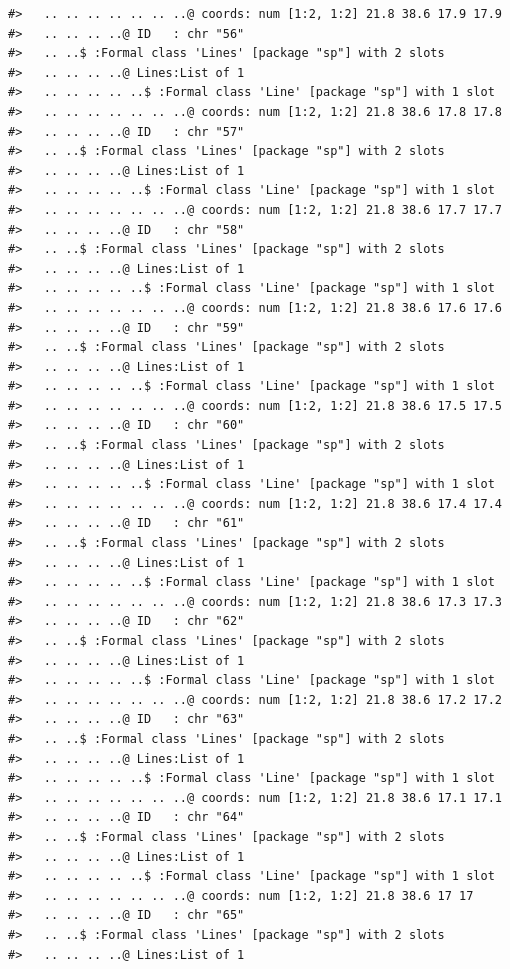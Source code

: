 \documentclass[12pt,a4paper,a4paper]{book}
\theoremstyle{definition}
\theoremstyle{definition}
\theoremstyle{definition}
\theoremstyle{remark}
\begin{document}
\begin{verbatim}
#>   .. .. .. .. .. .. ..@ coords: num [1:2, 1:2] 21.8 38.6 17.9 17.9
#>   .. .. .. ..@ ID   : chr "56"
#>   .. ..$ :Formal class 'Lines' [package "sp"] with 2 slots
#>   .. .. .. ..@ Lines:List of 1
#>   .. .. .. .. ..$ :Formal class 'Line' [package "sp"] with 1 slot
#>   .. .. .. .. .. .. ..@ coords: num [1:2, 1:2] 21.8 38.6 17.8 17.8
#>   .. .. .. ..@ ID   : chr "57"
#>   .. ..$ :Formal class 'Lines' [package "sp"] with 2 slots
#>   .. .. .. ..@ Lines:List of 1
#>   .. .. .. .. ..$ :Formal class 'Line' [package "sp"] with 1 slot
#>   .. .. .. .. .. .. ..@ coords: num [1:2, 1:2] 21.8 38.6 17.7 17.7
#>   .. .. .. ..@ ID   : chr "58"
#>   .. ..$ :Formal class 'Lines' [package "sp"] with 2 slots
#>   .. .. .. ..@ Lines:List of 1
#>   .. .. .. .. ..$ :Formal class 'Line' [package "sp"] with 1 slot
#>   .. .. .. .. .. .. ..@ coords: num [1:2, 1:2] 21.8 38.6 17.6 17.6
#>   .. .. .. ..@ ID   : chr "59"
#>   .. ..$ :Formal class 'Lines' [package "sp"] with 2 slots
#>   .. .. .. ..@ Lines:List of 1
#>   .. .. .. .. ..$ :Formal class 'Line' [package "sp"] with 1 slot
#>   .. .. .. .. .. .. ..@ coords: num [1:2, 1:2] 21.8 38.6 17.5 17.5
#>   .. .. .. ..@ ID   : chr "60"
#>   .. ..$ :Formal class 'Lines' [package "sp"] with 2 slots
#>   .. .. .. ..@ Lines:List of 1
#>   .. .. .. .. ..$ :Formal class 'Line' [package "sp"] with 1 slot
#>   .. .. .. .. .. .. ..@ coords: num [1:2, 1:2] 21.8 38.6 17.4 17.4
#>   .. .. .. ..@ ID   : chr "61"
#>   .. ..$ :Formal class 'Lines' [package "sp"] with 2 slots
#>   .. .. .. ..@ Lines:List of 1
#>   .. .. .. .. ..$ :Formal class 'Line' [package "sp"] with 1 slot
#>   .. .. .. .. .. .. ..@ coords: num [1:2, 1:2] 21.8 38.6 17.3 17.3
#>   .. .. .. ..@ ID   : chr "62"
#>   .. ..$ :Formal class 'Lines' [package "sp"] with 2 slots
#>   .. .. .. ..@ Lines:List of 1
#>   .. .. .. .. ..$ :Formal class 'Line' [package "sp"] with 1 slot
#>   .. .. .. .. .. .. ..@ coords: num [1:2, 1:2] 21.8 38.6 17.2 17.2
#>   .. .. .. ..@ ID   : chr "63"
#>   .. ..$ :Formal class 'Lines' [package "sp"] with 2 slots
#>   .. .. .. ..@ Lines:List of 1
#>   .. .. .. .. ..$ :Formal class 'Line' [package "sp"] with 1 slot
#>   .. .. .. .. .. .. ..@ coords: num [1:2, 1:2] 21.8 38.6 17.1 17.1
#>   .. .. .. ..@ ID   : chr "64"
#>   .. ..$ :Formal class 'Lines' [package "sp"] with 2 slots
#>   .. .. .. ..@ Lines:List of 1
#>   .. .. .. .. ..$ :Formal class 'Line' [package "sp"] with 1 slot
#>   .. .. .. .. .. .. ..@ coords: num [1:2, 1:2] 21.8 38.6 17 17
#>   .. .. .. ..@ ID   : chr "65"
#>   .. ..$ :Formal class 'Lines' [package "sp"] with 2 slots
#>   .. .. .. ..@ Lines:List of 1

\end{verbatim}
\end{document}
